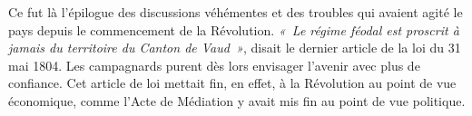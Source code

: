 \documentclass[french,twoside]{book} %
\newif\ifdev
\renewcommand{\LettrineFontHook}{\color{rubric}}
\newcommand{\initialiv}[2]{%
  \let\oldLFH\LettrineFontHook
  \IfSubStr{QJ’}{#1}{
    \lettrine[lines=4, lhang=0.2, loversize=-0.1, lraise=0.2]{\smash{#1}}{#2}
  }{\IfSubStr{É}{#1}{
    \lettrine[lines=4, lhang=0.2, loversize=-0, lraise=0]{\smash{#1}}{#2}
  }{\IfSubStr{ÀÂ}{#1}{
    \lettrine[lines=4, lhang=0.2, loversize=-0, lraise=0, slope=0.6em]{\smash{#1}}{#2}
  }{\IfSubStr{A}{#1}{
    \lettrine[lines=4, lhang=0.2, loversize=0.2, slope=0.6em]{\smash{#1}}{#2}
  }{\IfSubStr{V}{#1}{
    \lettrine[lines=4, lhang=0.2, loversize=0.2, slope=-0.5em]{\smash{#1}}{#2}
  }{
    \lettrine[lines=4, lhang=0.2, loversize=0.2]{\smash{#1}}{#2}
  }}}}}
  \let\LettrineFontHook\oldLFH
}
\newcommand\chapterclose{} %
\renewcommand{\LettrineFontHook}{\bfseries\color{rubric}}
\begin{document}
Ce fut là l’épilogue des discussions véhémentes et des troubles qui avaient agité le pays depuis le commencement de la Révolution. \emph{« Le régime féodal est proscrit à jamais du territoire du Canton de Vaud »}, disait le dernier article de la loi du 31 mai 1804. Les campagnards purent dès lors envisager l’avenir avec plus de confiance. Cet article de loi mettait fin, en effet, à la Révolution au point de vue économique, comme l’Acte de Médiation y avait mis fin au point de vue politique.
\chapterclose

 


\ifbooklet
  \newpage\null\thispagestyle{empty}\newpage
\fi

\ifdev %
\fontname\font — \textsc{Les règles du jeu}\par
(\hyperref[utopie]{\underline{Lien}})\par
\noindent \initialiv{A}{lors là}\blindtext\par
\noindent \initialiv{À}{ la bonheur des dames}\blindtext\par
\noindent \initialiv{É}{tonnez-le}\blindtext\par
\noindent \initialiv{Q}{ualitativement}\blindtext\par
\noindent \initialiv{V}{aloriser}\blindtext\par
\Blindtext
\phantomsection
\label{utopie}
\Blinddocument
\fi
\end{document}
